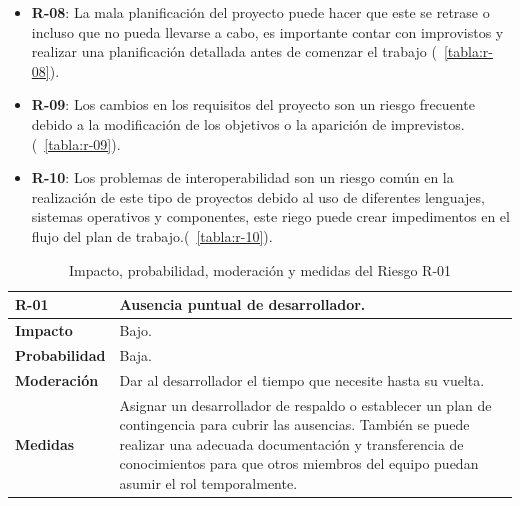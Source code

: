 \begin{itemize}
    \item \textbf{R-08}: La mala planificación del proyecto puede hacer que este se retrase o incluso que no pueda llevarse a cabo, es importante contar con improvistos y realizar una planificación detallada antes de comenzar el trabajo (~\ref{tabla:r-08}).
    \item \textbf{R-09}: Los cambios en los requisitos del proyecto son un riesgo frecuente debido a la modificación de los objetivos o la aparición de imprevistos.(~\ref{tabla:r-09}).
    \item \textbf{R-10}: Los problemas de interoperabilidad son un riesgo común en la realización de este tipo de proyectos debido al uso de diferentes lenguajes, sistemas operativos y componentes, este riego puede crear impedimentos en el flujo del plan de trabajo.(~\ref{tabla:r-10}).
\end{itemize}
    
\begin{table}[htbp]
\begin{center}
\begin{tabular}{|l|p{12cm}|}
\hline
\textbf{R-01} & Ausencia puntual de desarrollador. \\ \hline
\textbf{Impacto} & Bajo. \\ \hline
\textbf{Probabilidad} & Baja. \\ \hline
\textbf{Moderación} & Dar al desarrollador el tiempo que necesite hasta su vuelta. \\ \hline
\textbf{Medidas} & Asignar un desarrollador de respaldo o establecer un plan de contingencia para cubrir las ausencias. También se puede realizar una adecuada documentación y transferencia de conocimientos para que otros miembros del equipo puedan asumir el rol temporalmente.\\ \hline
\end{tabular}
\caption[Riesgo R-01]{Impacto, probabilidad, moderación y medidas del Riesgo R-01}
\label{tabla:r-01}
\end{center}
\end{table}
 

